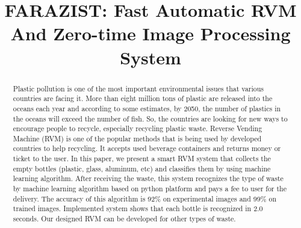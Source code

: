 \documentclass[conference]{IEEEtran}
\begin{document}
\title{FARAZIST: Fast Automatic RVM And Zero-time Image Processing System}


\author{
\and
{}
\and
{}
}

\maketitle

\begin{abstract}
Plastic pollution is one of the most important environmental issues that various countries are facing it. More than eight million tons of plastic are released into the oceans each year and according to some estimates, by 2050, the number of plastics in the oceans will exceed the number of fish. So, the countries are looking for new ways to encourage people to recycle, especially recycling plastic waste. Reverse Vending Machine (RVM) is one of the popular methods that is being used by developed countries to help recycling. It accepts used beverage containers and returns money or ticket to the user. In this paper, we present a smart RVM system that collects the empty bottles (plastic, glass, aluminum, etc) and classifies them by using machine learning algorithm. After receiving the waste, this system recognizes the type of waste by machine learning algorithm based on python platform and pays a fee to user for the delivery. The accuracy of this  algorithm is 92\% on experimental images and 99\% on trained images. Implemented system shows that each bottle is recognized in 2.0 seconds. Our designed RVM can be developed for other types of waste.
\end{abstract}
\end{document}
